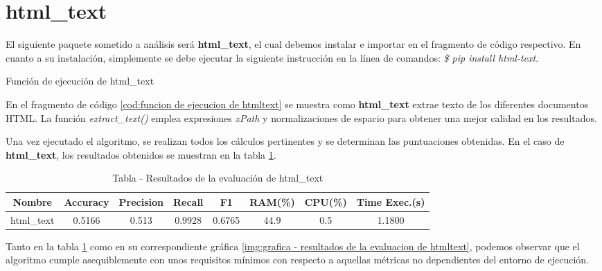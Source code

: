 \section*{html\_text}

El siguiente paquete sometido a análisis será \textbf{html\_text}, el cual debemos instalar e importar en 
el fragmento de código respectivo. En cuanto a su instalación, simplemente se debe ejecutar la siguiente 
instrucción en la línea de comandos: \emph{\$ pip install html-text}.

\begin{codefloat}
    
    \caption{Función de ejecución de html\_text}
    \label{cod:funcion de ejecucion de htmltext}
\end{codefloat}

En el fragmento de código \ref{cod:funcion de ejecucion de htmltext} se muestra como \textbf{html\_text} 
extrae texto de los diferentes documentos HTML. La función \emph{extract\_text()} emplea expresiones 
\emph{xPath} y normalizaciones de espacio para obtener una mejor calidad en los resultados.

Una vez ejecutado el algoritmo, se realizan todos los cálculos pertinentes y se determinan las puntuaciones 
obtenidas. En el caso de \textbf{html\_text}, los resultados obtenidos se muestran en la tabla 
\ref{tab:tabla - resultados de la evaluacion de htmltext}.

\begin{table}[h]
    \begin{center}
      \begin{tabular}{| c | c | c | c | c | c | c | c |} \hline 
       \textbf{Nombre} & \textbf{Accuracy} & \textbf{Precision}  & \textbf{Recall} & \textbf{F1} & \textbf{RAM(\%)} & \textbf{CPU(\%)} & \textbf{Time Exec.(s)} \\ \hline
       html\_text & 0.5166 & 0.513 & 0.9928 & 0.6765 & 44.9 & 0.5 & 1.1800 \\ \hline
      \end{tabular}
      \caption{Tabla - Resultados de la evaluación de html\_text}
      \label{tab:tabla - resultados de la evaluacion de htmltext}
    \end{center}
\end{table}

Tanto en la tabla \ref{tab:tabla - resultados de la evaluacion de htmltext} como en su correspondiente
gráfica \ref{img:grafica - resultados de la evaluacion de htmltext}, podemos observar que el algoritmo
cumple asequiblemente con unos requisitos mínimos con respecto a aquellas métricas no dependientes del
entorno de ejecución.

